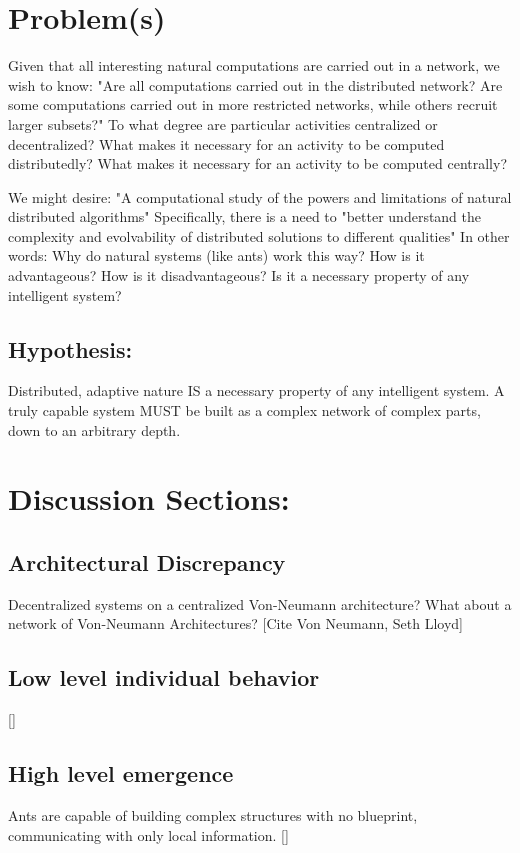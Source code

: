 \documentclass{nature}
\begin{document}
\section{Problem(s)}

Given that all interesting natural computations are carried out in a network, we wish to know: 
"Are all computations carried out in the distributed network? Are some computations carried out in more restricted networks, while others recruit larger subsets?"
To what degree are particular activities centralized or decentralized?
What makes it necessary for an activity to be computed distributedly?
What makes it necessary for an activity to be computed centrally?

We might desire: "A computational study of the powers and limitations of natural distributed algorithms" Specifically, there is a need to "better understand the complexity and evolvability of distributed solutions to different qualities"
In other words: Why do natural systems (like ants) work this way?
How is it advantageous?
How is it disadvantageous?
Is it a necessary property of any intelligent system?

\subsection{Hypothesis:}
Distributed, adaptive nature IS a necessary property of any intelligent system.
A truly capable system MUST be built as a complex network of complex parts, down to an arbitrary depth.


\section{Discussion Sections:}
\subsection{Architectural Discrepancy}
    Decentralized systems on a centralized Von-Neumann architecture? What about a network of Von-Neumann Architectures?
    [Cite Von Neumann, Seth Lloyd]
\subsection{Low level individual behavior}
    []
\subsection{High level emergence}
    Ants are capable of building complex structures with no blueprint, communicating with only local information.
    []
\end{document}
